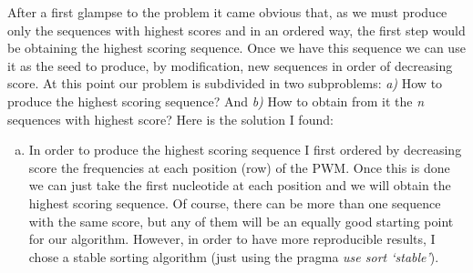 \documentclass{article}
\begin{document}
After a first glampse to the problem it came obvious that, as we must produce only the sequences with highest scores and in an ordered way, the first step would be obtaining the highest scoring sequence. Once we have this sequence we can use it as the seed to produce, by modification, new sequences in order of decreasing score. At this point our problem is subdivided in two subproblems: \emph{a) } How to produce the highest scoring sequence? And \emph{b) } How to obtain from it the \emph{n} sequences with highest score? Here is the solution I found:\\
\begin{enumerate}[a)]
\item In order to produce the highest scoring sequence I first ordered by decreasing score the frequencies at each position (row) of the PWM. Once this is done we can just take the first nucleotide at each position and we will obtain the highest scoring sequence. Of course, there can be more than one sequence with the same score, but any of them will be an equally good starting point for our algorithm. However, in order to have more reproducible results, I chose a stable sorting algorithm (just using the pragma \emph{use sort `stable'}).


\end{enumerate}
\end{document}
